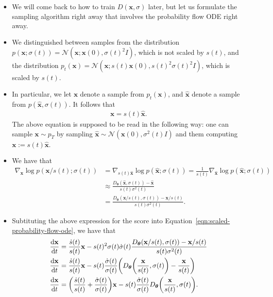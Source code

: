\documentclass[10pt]{article}
\newcommand{\dee}{\mathrm{d}}
\newcommand{\ve}[1]{\mathbf{#1}}
\newcommand{\ves}[1]{\boldsymbol{#1}}
\newcommand{\mcal}[1]{\mathcal{#1}}
\begin{document}
\begin{itemize}
  \item We will come back to how to train $D(\ve{x},\sigma)$ later, but let us formulate the sampling algorithm right away that involves the probability flow ODE right away.
  
  \item We distinguished between samples from the distribution $p(\ve{x};\sigma(t)) = \mcal{N}(\ve{x}; \ve{x}(0), \sigma(t)^2 I)$, which is not scaled by $s(t)$, and the distribution $p_t(\ve{x}) = \mcal{N}(\ve{x}; s(t)\ve{x}(0), s(t)^2 \sigma(t)^2 I)$, which is scaled by $s(t)$.
    
  \item In particular, we let $\ve{x}$ denote a sample from $p_t(\ve{x})$, and $\hat{\ve{x}}$ denote a sample from $p(\hat{\ve{x}}, \sigma(t))$. It follows that
  \begin{align*}
    \ve{x} = s(t) \hat{\ve{x}}.
  \end{align*}
  The above equation is supposed to be read in the following way: one can sample $\ve{x} \sim p_T$ by sampling $\hat{\ve{x}} \sim \mcal{N}(\ve{x}(0), \sigma^2(t)I)$ and them computing $\ve{x} := s(t)\hat{\ve{x}}$.

  \item We have that
  \begin{align*}
    \nabla_{\ve{x}} \log p(\ve{x}/s(t); \sigma(t))
    &= \nabla_{s(t)\hat{\ve{x}}} \log p(\hat{\ve{x}}; \sigma(t))
    = \frac{1}{s(t)} \nabla_{\hat{\ve{x}}} \log p(\hat{\ve{x}}; \sigma(t)) \\
    &\approx \frac{D_{\ves{\theta}}(\hat{\ve{x}}, \sigma(t)) - \hat{\ve{x}}}{s(t)\sigma^2(t)} \\
    &= \frac{D_{\ves{\theta}}(\ve{x}/s(t), \sigma(t)) - \ve{x}/s(t)}{s(t)\sigma^2(t)}.
  \end{align*}

  \item Subtituting the above expression for the score into Equation~\ref{eqn:scaled-probability-flow-ode}, we have that
  \begin{align}
    \frac{\dee \ve{x}}{\dee t}
    &= \frac{\dot{s}(t)}{s(t)} \ve{x} - s(t)^2 \sigma(t) \dot{\sigma}(t) \frac{D_{\ves{\theta}}(\ve{x}/s(t), \sigma(t)) - \ve{x}/s(t)}{s(t)\sigma^2(t)} \notag \\
    \frac{\dee \ve{x}}{\dee t} 
    &= \frac{\dot{s}(t)}{s(t)} \ve{x} - s(t) \frac{\dot{\sigma}(t)}{\sigma(t)} \bigg( D_{\ves{\theta}}\bigg(\frac{\ve{x}}{s(t)}, \sigma(t)\bigg) - \frac{\ve{x}}{s(t)} \bigg) \notag \\
    \frac{\dee \ve{x}}{\dee t}
    &= \bigg( \frac{\dot{s}(t)}{s(t)} + \frac{\dot{\sigma}(t)}{\sigma(t)} \bigg) \ve{x} - s(t) \frac{\dot{\sigma}(t)}{\sigma(t)} D_{\ves{\theta}}\bigg(\frac{\ve{x}}{s(t)}, \sigma(t)\bigg). \label{eqn:probability-flow-ode-in-practice}
  \end{align}


\end{itemize}
\end{document}
